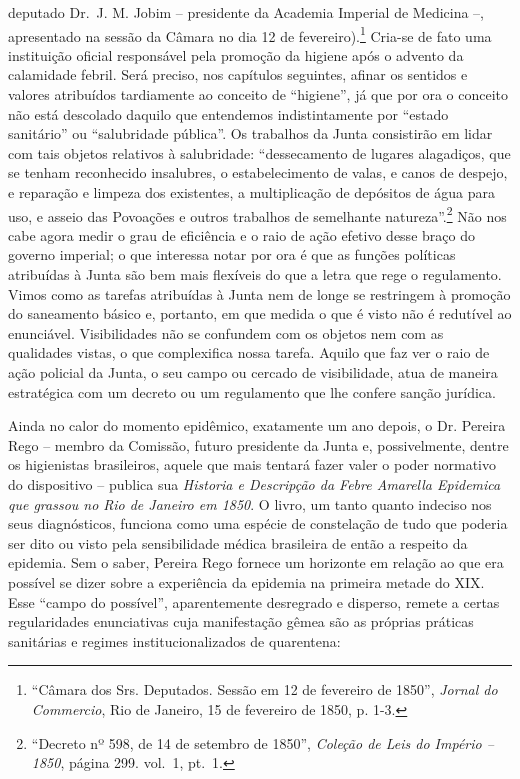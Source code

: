 deputado Dr.~J. M. Jobim -- presidente da Academia Imperial de Medicina
--, apresentado na sessão da Câmara no dia 12 de fevereiro).\footnote{``Câmara
  dos Srs. Deputados. Sessão em 12 de fevereiro de 1850'', \emph{Jornal
  do Commercio}, Rio de Janeiro, 15 de fevereiro de 1850, p. 1-3.}
Cria-se de fato uma instituição oficial responsável pela promoção da
higiene após o advento da calamidade febril. Será preciso, nos capítulos
seguintes, afinar os sentidos e valores atribuídos tardiamente ao
conceito de ``higiene'', já que por ora o conceito não está descolado
daquilo que entendemos indistintamente por ``estado sanitário'' ou
``salubridade pública''. Os trabalhos da Junta consistirão em lidar com
tais objetos relativos à salubridade: ``dessecamento de lugares
alagadiços, que se tenham reconhecido insalubres, o estabelecimento de
valas, e canos de despejo, e reparação e limpeza dos existentes, a
multiplicação de depósitos de água para uso, e asseio das Povoações e
outros trabalhos de semelhante natureza''.\footnote{``Decreto nº 598, de
  14 de setembro de 1850'', \emph{Coleção de Leis do Império -- 1850},
  página 299. vol.~1, pt.~1.} Não nos cabe agora medir o grau de
eficiência e o raio de ação efetivo desse braço do governo imperial; o
que interessa notar por ora é que as funções políticas atribuídas à
Junta são bem mais flexíveis do que a letra que rege o regulamento.
Vimos como as tarefas atribuídas à Junta nem de longe se restringem à
promoção do saneamento básico e, portanto, em que medida o que é visto
não é redutível ao enunciável. Visibilidades não se confundem com os
objetos nem com as qualidades vistas, o que complexifica nossa tarefa.
Aquilo que faz ver o raio de ação policial da Junta, o seu campo ou
cercado de visibilidade, atua de maneira estratégica com um decreto ou
um regulamento que lhe confere sanção jurídica.

Ainda no calor do momento epidêmico, exatamente um ano depois, o Dr.
Pereira Rego -- membro da Comissão, futuro presidente da Junta e,
possivelmente, dentre os higienistas brasileiros, aquele que mais
tentará fazer valer o poder normativo do dispositivo -- publica sua
\emph{Historia e Descripção da Febre Amarella Epidemica que grassou no
Rio de Janeiro em 1850}. O livro, um tanto quanto indeciso nos seus
diagnósticos, funciona como uma espécie de constelação de tudo que
poderia ser dito ou visto pela sensibilidade médica brasileira de então
a respeito da epidemia. Sem o saber, Pereira Rego fornece um horizonte
em relação ao que era possível se dizer sobre a experiência da epidemia
na primeira metade do XIX. Esse ``campo do possível'', aparentemente
desregrado e disperso, remete a certas regularidades enunciativas cuja
manifestação gêmea são as próprias práticas sanitárias e regimes
institucionalizados de quarentena:

